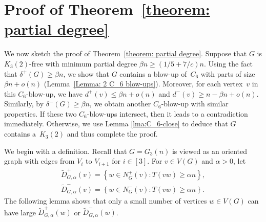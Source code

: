 \documentclass[11pt]{article}
\numberwithin{equation}{section}
\begin{document}
	
	
	
	
	
	
	
	
	
	
	
	
	
	
	
	
	
	
	
	
	
	\section{Proof of Theorem~\ref{theorem: partial degree}}\label{Section: Linear minimum partial degree}
	
	We now sketch the proof of Theorem~\ref{theorem: partial degree}.
	Suppose that $G$ is $K_3(2)$-free with minimum partial degree $\beta n\geq (1/5 + 7/c )n$. 
	Using the fact that $\delta^+(G) \ge \beta n$, we show that $G$ contains a blow-up of~$C_6$ with parts of size $\beta n +o(n)$ (Lemma~\ref{Lemma: 2 C_6 blow-ups}). 
	Moreover, for each vertex~$v$ in this $C_6$-blow-up, we have $d^+(v) \le \beta n +o(n)$ and $d^-(v) \ge n- \beta n +o(n)$.
	Similarly, by $\delta^-(G) \ge \beta n$, we obtain another $C_6$-blow-up with similar properties. 
	If these two $C_6$-blow-ups intersect, then it leads to a contradiction immediately. Otherwise, we use Lemma \ref{lma:C_6-close} to deduce that $G$ contains a~$K_3(2)$ and thus complete the proof.
	
	
	
	We begin with a definition. 
	Recall that $G=G_3(n)$ is viewed as an oriented graph with edges from $V_i$ to $V_{i+1}$ for $i\in [3]$. 
	For $v\in V(G)$ and $\alpha >0$, let 
	\begin{align*}
		\widetilde{D}^+_{ G,\alpha }(v)=\left \{ w \in N^+_G(v): T(vw) \geq \alpha n \right\}, \\ \widetilde{D}^-_{ G,\alpha }(v)=\left \{ w \in N^-_G(v): T(vw) \geq \alpha n \right\}.
	\end{align*}
	The following lemma shows that only a small number of vertices $w\in V(G)$ can have large $\widetilde{D}^+_{ G,\alpha }(w)$ or $\widetilde{D}^-_{ G,\alpha }(w)$.
\end{document}
